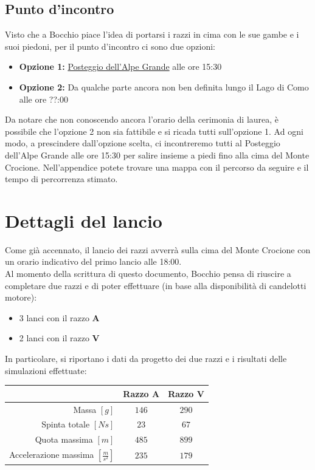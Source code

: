 \documentclass[12pt, a4paper]{article}
\begin{document}
\subsection*{Punto d'incontro}
Visto che a Bocchio piace l'idea di portarsi i razzi in cima con le sue gambe e i suoi piedoni, per il punto d'incontro ci sono due opzioni:
\begin{itemize}
    \item \textbf{Opzione 1:} \href{https://goo.gl/maps/Su7WTxJfbVN4Esc36}{Posteggio dell'Alpe Grande} alle ore 15:30
    \item \textbf{Opzione 2:} Da qualche parte ancora non ben definita lungo il Lago di Como alle ore ??:00
\end{itemize}
Da notare che non conoscendo ancora l'orario della cerimonia di laurea, è possibile che l'opzione 2 non sia fattibile e si ricada tutti sull'opzione 1.
Ad ogni modo, a prescindere dall'opzione scelta, ci incontreremo tutti al Posteggio dell'Alpe Grande alle ore 15:30 per salire insieme a piedi fino alla cima del Monte Crocione.
Nell'appendice potete trovare una mappa con il percorso da seguire e il tempo di percorrenza stimato.


\section{Dettagli del lancio}

Come già accennato, il lancio dei razzi avverrà sulla cima del Monte Crocione con un orario indicativo del primo lancio alle 18:00.\\
Al momento della scrittura di questo documento, Bocchio pensa di riuscire a completare due razzi e di poter effettuare (in base alla disponibilità di candelotti motore):
\begin{itemize}
    \item 3 lanci con il razzo \textbf{A}
    \item 2 lanci con il razzo \textbf{V}
\end{itemize}
In particolare, si riportano i dati da progetto dei due razzi e i risultati delle simulazioni effettuate:
\begin{table}[h]
    \centering
    \begin{tabular}{|r|c|c|} \hline
        ~                                       & \textbf{Razzo A} & \textbf{Razzo V} \\ \hline
        Massa $[g]$                             & $146$            & $290$            \\ \hline
        Spinta totale $[Ns]$                    & $23$             & $67$             \\ \hline
        Quota massima $[m]$                     & $485$            & $899$            \\ \hline
        Accelerazione massima $[\frac{m}{s^2}]$ & $235$            & $179$            \\ \hline
    \end{tabular}
    \label{tab:obiettivi}
\end{table}
\end{document}
